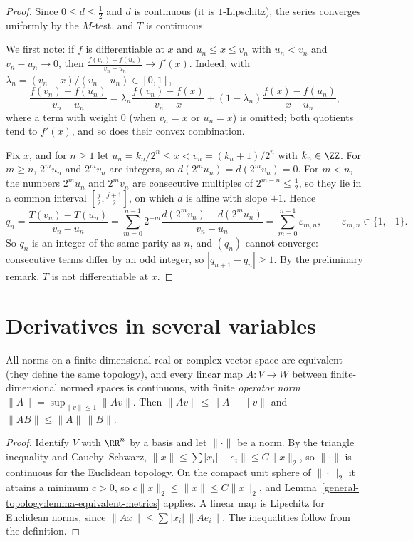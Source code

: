 \begin{proof}
Since $0 \leq d \leq \frac12$ and $d$ is continuous (it is $1$-Lipschitz), the series converges uniformly by the $M$-test, and $T$ is continuous.

We first note: if $f$ is differentiable at $x$ and $u_n \leq x \leq v_n$ with $u_n < v_n$ and $v_n - u_n \to 0$, then $\frac{f(v_n) - f(u_n)}{v_n - u_n} \to f'(x)$. Indeed, with $\lambda_n = (v_n - x)/(v_n - u_n) \in [0, 1]$,
\[
\frac{f(v_n) - f(u_n)}{v_n - u_n} = \lambda_n\frac{f(v_n) - f(x)}{v_n - x} + (1 - \lambda_n)\frac{f(x) - f(u_n)}{x - u_n},
\]
where a term with weight $0$ (when $v_n = x$ or $u_n = x$) is omitted; both quotients tend to $f'(x)$, and so does their convex combination.

Fix $x$, and for $n \geq 1$ let $u_n = k_n/2^n \leq x < v_n = (k_n + 1)/2^n$ with $k_n \in \ZZ$. For $m \geq n$, $2^mu_n$ and $2^mv_n$ are integers, so $d(2^mu_n) = d(2^mv_n) = 0$. For $m < n$, the numbers $2^mu_n$ and $2^mv_n$ are
consecutive multiples of $2^{m-n} \leq \frac12$, so they lie in a common interval $[\frac j2, \frac{j+1}2]$, on which $d$ is affine with slope $\pm1$. Hence
\[
q_n = \frac{T(v_n) - T(u_n)}{v_n - u_n} = \sum_{m=0}^{n-1}2^{-m}\frac{d(2^mv_n) - d(2^mu_n)}{v_n - u_n} = \sum_{m=0}^{n-1}\varepsilon_{m,n}, \qquad \varepsilon_{m,n} \in \{1, -1\}.
\]
So $q_n$ is an integer of the same parity as $n$, and $(q_n)$ cannot converge: consecutive terms differ by an odd integer, so $|q_{n+1} - q_n| \geq 1$. By the preliminary remark, $T$ is not differentiable at $x$.
\end{proof}

\section{Derivatives in several variables}\label{real-analysis:section-several-variables}

\begin{lemma}\label{real-analysis:lemma-norms}
All norms on a finite-dimensional real or complex vector space are equivalent (they define the same topology), and every linear map $A \colon V \to W$ between finite-dimensional normed spaces is
continuous, with finite \emph{operator norm} $\|A\| = \sup_{\|v\| \leq 1}\|Av\|$. Then $\|Av\| \leq \|A\|\,\|v\|$ and $\|AB\| \leq \|A\|\,\|B\|$.
\end{lemma}

\begin{proof}
Identify $V$ with $\RR^n$ by a basis and let $\|\cdot\|$ be a norm. By the triangle inequality and Cauchy--Schwarz, $\|x\| \leq \sum|x_i|\,\|e_i\| \leq C\|x\|_2$, so $\|\cdot\|$ is continuous for the
Euclidean topology. On the compact unit sphere of $\|\cdot\|_2$ it attains a minimum $c > 0$, so $c\|x\|_2 \leq \|x\| \leq C\|x\|_2$, and Lemma~\ref{general-topology:lemma-equivalent-metrics} applies. A linear map
is Lipschitz for Euclidean norms, since $\|Ax\| \leq \sum|x_i|\,\|Ae_i\|$. The inequalities follow from the definition.
\end{proof}

